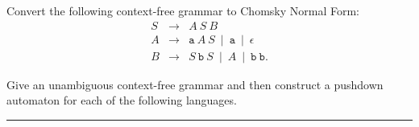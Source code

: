 \documentclass[a4page]{exam}
\newcommand{\Str}[1]{\mathtt{#1}}
\begin{document}
\begin{questions}

\question[10] Convert the following context-free grammar to Chomsky Normal Form:
  \begin{eqnarray*}
    S &\rightarrow& A\ S\ B\\
    A &\rightarrow& \Str{a}\ A\ S\ \mid\  \Str{a}\ \mid\ \epsilon \\
    B &\rightarrow& S\ \Str{b}\ S\ \mid\ A\ \mid\ \Str{b}\ \Str{b}.
  \end{eqnarray*}

\question Give an unambiguous context-free grammar and then construct a pushdown automaton for each of the following languages.
  
\end{questions}

\noindent\rule{\textwidth}{1pt}\\\vspace{1pt}
\end{document}
